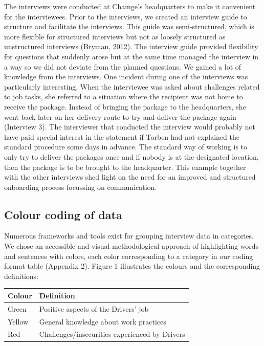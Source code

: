 The interviews were conducted at Chainge's headquarters to make it
convenient for the interviewees. Prior to the interviews, we created an
interview guide to structure and facilitate the interviews. This guide
was semi-structured, which is more flexible for structured interviews
but not as loosely structured as unstructured interviews (Bryman, 2012).
The interview guide provided flexibility for questions that suddenly
arose but at the same time managed the interview in a way so we did not
deviate from the planned questions. We gained a lot of knowledge from
the interviews. One incident during one of the interviews was
particularly interesting. When the interviewee was asked about
challenges related to job tasks, she referred to a situation where the
recipient was not home to receive the package. Instead of bringing the
package to the headquarters, she went back later on her delivery route
to try and deliver the package again (Interview 3). The interviewer that
conducted the interview would probably not have paid special interest in
the statement if Torben had not explained the standard procedure some
days in advance. The standard way of working is to only try to deliver
the packages once and if nobody is at the designated location, then the
package is to be brought to the headquarter. This example together with
the other interviews shed light on the need for an improved and
structured onboarding process focussing on communication.

\hypertarget{sec:colour_coding}{%
\subsection{Colour coding of data}\label{sec:colour_coding}}

Numerous frameworks and tools exist for grouping interview data in
categories. We chose an accessible and visual methodological approach of
highlighting words and sentences with colors, each color corresponding
to a category in our coding format table (Appendix 2). Figure 1
illustrates the colours and the corresponding definitions:

\begin{longtable}[]{@{}ll@{}}
\toprule
Colour & Definition \\
\midrule
\endhead
Green & Positive aspects of the Drivers' job \\
Yellow & General knowledge about work practices \\
Red & Challenges/insecurities experienced by Drivers \\
\bottomrule
\end{longtable}

